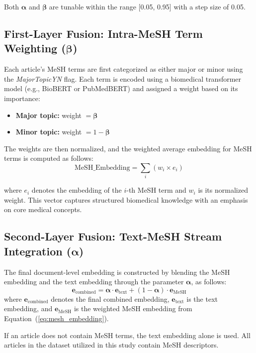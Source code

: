 \documentclass{ieeeaccess}
\begin{document}
Both $\boldsymbol{\alpha}$ and $\boldsymbol{\beta}$ are tunable within the range [0.05, 0.95] with a step size of 0.05.

\subsection{First-Layer Fusion: Intra-MeSH Term Weighting ($\boldsymbol{\beta}$)}

Each article’s MeSH terms are first categorized as either major or minor using the \textit{MajorTopicYN} flag. 
Each term is encoded using a biomedical transformer model (e.g., BioBERT or PubMedBERT) and assigned a weight based on its importance:

\begin{itemize}
    \item \textbf{Major topic:} weight $= \boldsymbol{\beta}$
    \item \textbf{Minor topic:} weight $= 1 - \boldsymbol{\beta}$
\end{itemize}

The weights are then normalized, and the weighted average embedding for MeSH terms is computed as follows:
\begin{equation}
\text{MeSH\_Embedding} = \sum_i (w_i \times e_i)
\label{eq:mesh_embedding}
\end{equation}

where $e_i$ denotes the embedding of the $i$-th MeSH term and $w_i$ is its normalized weight. 
This vector captures structured biomedical knowledge with an emphasis on core medical concepts.

\subsection{Second-Layer Fusion: Text-MeSH Stream Integration ($\boldsymbol{\alpha}$)}
The final document-level embedding is constructed by blending the MeSH embedding and the text embedding through the parameter $\boldsymbol{\alpha}$, as follows:
\begin{equation}
\bm{e}_{\text{combined}} = \boldsymbol{\alpha} \cdot \bm{e}_{\text{text}} + (1 - \boldsymbol{\alpha}) \cdot \bm{e}_{\text{MeSH}}
\label{eq:combined_embedding}
\end{equation}
where $\bm{e}_{\text{combined}}$ denotes the final combined embedding, $\bm{e}_{\text{text}}$ is the text embedding, and $\bm{e}_{\text{MeSH}}$ is the weighted MeSH embedding from Equation~(\ref{eq:mesh_embedding}).

If an article does not contain MeSH terms, the text embedding alone is used.
All articles in the dataset utilized in this study contain MeSH descriptors.
\end{document}
